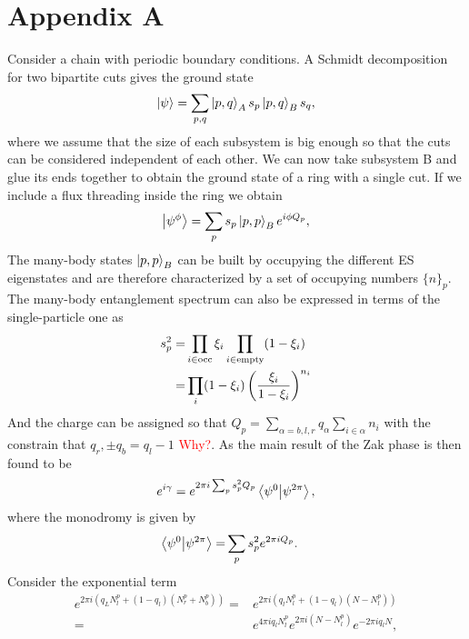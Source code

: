 \documentclass[twocolumn,amsmath,longbibliography,amssymb,superscriptaddress]{revtex4-1}
\begin{document}
	

	
\appendix


\section{Appendix A}
	
Consider a chain with periodic boundary conditions. A Schmidt decomposition for two bipartite cuts gives the ground state
\begin{equation}
\ket{\psi} = \sum_{p,q} \ket{p,q}_A s_p \ket{p,q}_B s_q,
\end{equation}
where we assume that the size of each subsystem is big enough so that the cuts can be considered independent of each other. We can now take subsystem B and glue its ends together to obtain the ground state of a ring with a single cut. If we include a flux threading inside the ring we obtain
\begin{equation}
\ket{\psi^\phi} = \sum_p s_p \ket{p,p}_B e^{i\phi Q_p},
\end{equation}
The many-body states $\ket{p,p}_B$ can be built by occupying the different ES eigenstates and are therefore characterized by a set of occupying numbers $\{n\}_p$. The many-body entanglement spectrum can also be expressed in terms of the single-particle one \cite{Alexandrinata2011} as
\begin{align}
s_p^2 =& \prod_{i \in {\rm occ}} \xi_i \prod_{i \in {\rm empty}}(1-\xi_i) \\
=& \prod_i (1-\xi_i)\left(\frac{\xi_i}{1-\xi_i} \right)^{n_i}
\end{align}
And the charge can be assigned so that $Q_p = \sum_{\alpha = b,l,r} q_\alpha\sum_{i \in \alpha} n_i$ with the constrain that $q_r,\pm q_b = q_l-1$ \textcolor{red}{Why?}. As the main result of \cite{Zaletel2014} the Zak phase is then found to be
\begin{align}
e^{i\gamma} = e^{2\pi i \sum_p s_p^2 Q_p}  \bra{\psi^0}\ket{\psi^{2\pi}},
\label{zaletel}
\end{align}
where the monodromy is given by
\begin{align}
\bra{\psi^0}\ket{\psi^{2\pi}} =& \sum_p s_p^2 e^{2\pi i Q_p}.
\end{align}
Consider the exponential term
\begin{align*}
e^{2\pi i (q_L N^p_l + (1-q_l)(N^p_r+N^p_b))} =& e^{2\pi i (q_l N^p_l + (1-q_l)(N-N^p_l))} \\
=& e^{4\pi i q_l N^p_l}e^{2 \pi i (N-N^p_l)}e^{-2\pi i q_l N },
\end{align*}
\end{document}
